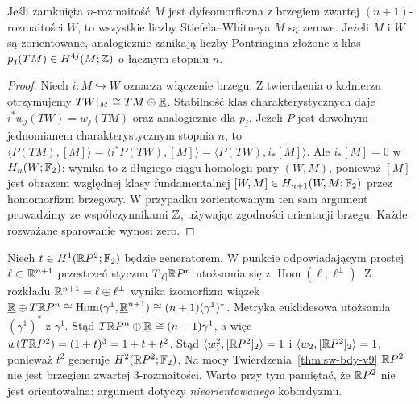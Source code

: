 \begin{twierdzenie}
\label{thm:sw-bdy-v9}
Jeśli zamknięta $n$-rozmaitość $M$ jest dyfeomorficzna
z brzegiem zwartej $(n+1)$-rozmaitości $W$, to
wszystkie liczby Stiefela--Whitneya $M$ są zerowe.
Jeżeli $M$ i $W$ są zorientowane, analogicznie
zanikają liczby Pontriagina złożone z klas
$p_j(TM)\in H^{4j}(M;\mathbb{Z})$ o łącznym stopniu $n$.
\end{twierdzenie}
\begin{proof}
Niech $i:M\hookrightarrow W$ oznacza włączenie brzegu.
Z twierdzenia o kołnierzu otrzymujemy
$TW|_M\cong TM\oplus\underline{\mathbb{R}}$.
Stabilność klas charakterystycznych daje
$i^*w_j(TW)=w_j(TM)$ oraz analogicznie dla $p_j$.
Jeżeli $P$ jest dowolnym jednomianem charakterystycznym
stopnia $n$, to
$\langle P(TM),[M]\rangle=
\langle i^*P(TW),[M]\rangle=
\langle P(TW),i_*[M]\rangle$.
Ale $i_*[M]=0$ w $H_n(W;\mathbb{F}_2)$:
wynika to z długiego ciągu homologii pary $(W,M)$,
ponieważ $[M]$ jest obrazem względnej klasy fundamentalnej
$[W,M]\in H_{n+1}(W,M;\mathbb{F}_2)$ przez homomorfizm brzegowy.
W przypadku zorientowanym ten sam argument prowadzimy
ze współczynnikami $\mathbb{Z}$, używając zgodności
orientacji brzegu. Każde rozważane sparowanie wynosi zero.
\end{proof}

\begin{przyklad}
Niech $t\in H^1(\mathbb{R} P^2;\mathbb{F}_2)$ będzie generatorem.
W punkcie odpowiadającym prostej $\ell\subset\mathbb{R}^{n+1}$
przestrzeń styczna $T_{[\ell]}\mathbb{R} P^n$ utożsamia się
z $\operatorname{Hom}(\ell,\ell^\perp)$. Z rozkładu
$\mathbb{R}^{n+1}=\ell\oplus\ell^\perp$ wynika izomorfizm
wiązek
$\underline{\mathbb{R}}\oplus T\mathbb{R} P^n
\cong\operatorname{Hom}(\gamma^1,\underline{\mathbb{R}}^{n+1})
\cong(n+1)(\gamma^1)^*$.
Metryka euklidesowa utożsamia $(\gamma^1)^*$ z
$\gamma^1$. Stąd
$T\mathbb{R} P^n\oplus\underline{\mathbb{R}}\cong(n+1)\gamma^1$,
a więc $w(T\mathbb{R} P^2)=(1+t)^3=1+t+t^2$.
Stąd $\langle w_1^2,[\mathbb{R} P^2]_2\rangle=1$ i
$\langle w_2,[\mathbb{R} P^2]_2\rangle=1$, ponieważ
$t^2$ generuje $H^2(\mathbb{R} P^2;\mathbb{F}_2)$.
Na mocy Twierdzenia~\ref{thm:sw-bdy-v9}
$\mathbb{R} P^2$ nie jest brzegiem zwartej $3$-rozmaitości.
Warto przy tym pamiętać, że $\mathbb{R} P^2$ nie jest
orientowalna: argument dotyczy \emph{nieorientowanego}
kobordyzmu.
\end{przyklad}

